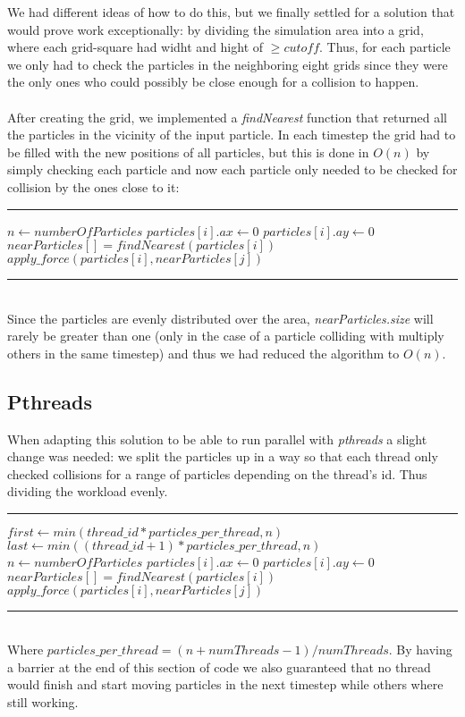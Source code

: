 \documentclass[11pt,a4paper]{article}
\begin{document}
We had different ideas of how to do this, but we finally settled for a solution that would prove work exceptionally: by dividing the simulation area into a grid, where each grid-square had widht and hight of $\geq cutoff$. Thus, for each particle we only had to check the particles in the neighboring eight grids since they were the only ones who could possibly be close enough for a collision to happen.
\\
\\
After creating the grid, we implemented a \emph{findNearest} function that returned all the particles in the vicinity of the input particle. In each timestep the grid had to be filled with the new positions of all particles, but this is done in $O(n)$ by simply checking each particle and now each particle only needed to be checked for collision by the ones close to it:
\\
\rule{125mm}{0.1pt}
\begin{algorithmic}
\STATE $n \gets numberOfParticles$
	\STATE $particles[i].ax \gets 0$
	\STATE $particles[i].ay \gets 0$
	\STATE $nearParticles[] = findNearest(particles[i])$
			\STATE $apply\_force(particles[i],nearParticles[j])$
	\ENDFOR
\ENDFOR 
\end{algorithmic}
\rule{125mm}{0.1pt}
\vspace{10pt}
\\
Since the particles are evenly distributed over the area, \emph{nearParticles.size} will rarely be greater than one (only in the case of a particle colliding with multiply others in the same timestep) and thus we had reduced the algorithm to $O(n)$.

\subsection{Pthreads}
When adapting this solution to be able to run parallel with \emph{pthreads} a slight change was needed: we split the particles up in a way so that each thread only checked collisions for a range of particles depending on the thread's id. Thus dividing the workload evenly.
\\
\rule{125mm}{0.1pt}
\begin{algorithmic}
\STATE $first \gets min(thread\_id * particles\_per\_thread,n)$
\STATE $last \gets min((thread\_id+1) * particles\_per\_thread,n)$
\STATE $n \gets numberOfParticles$
	\STATE $particles[i].ax \gets 0$
	\STATE $particles[i].ay \gets 0$
	\STATE $nearParticles[] = findNearest(particles[i])$
			\STATE $apply\_force(particles[i],nearParticles[j])$
	\ENDFOR
\ENDFOR 
\end{algorithmic}
\rule{125mm}{0.1pt}
\vspace{10pt}
\\
Where $particles\_per\_thread = (n+numThreads-1)/numThreads$. By having a barrier at the end of this section of code we also guaranteed that no thread would finish and start moving particles in the next timestep while others where still working.
\end{document}
